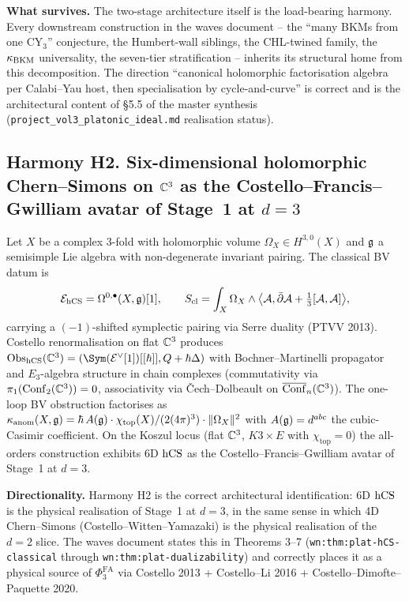 \textbf{What survives.} The two-stage architecture itself is the load-bearing
harmony. Every downstream construction in the waves document -- the
``many BKMs from one CY$_3$'' conjecture, the Humbert-wall siblings,
the CHL-twined family, the $\kappa_{\mathrm{BKM}}$ universality, the seven-tier
stratification -- inherits its structural home from this decomposition.
The direction ``canonical holomorphic factorisation algebra
per Calabi--Yau host, then specialisation by cycle-and-curve'' is
correct and is the architectural content of \S5.5 of the master
synthesis (\verb|project_vol3_platonic_ideal.md| realisation status).

\subsection{Harmony H2. Six-dimensional holomorphic Chern--Simons on
$\mathbb{C}^3$ as the Costello--Francis--Gwilliam avatar of Stage~1 at $d = 3$}
\label{wn:subsec:H2-6d-hCS}

\begin{theorem}\ClaimStatusScoped
\label{wn:thm:H2-6d-hCS}
Let $X$ be a complex 3-fold with holomorphic volume
$\Omega_X \in H^{3,0}(X)$ and $\mathfrak{g}$ a semisimple Lie algebra with
non-degenerate invariant pairing. The classical BV datum is
\[
\mathcal{E}_{\mathrm{hCS}} = \Omega^{0,\bullet}(X, \mathfrak{g})[1],
\qquad
S_{\mathrm{cl}} = \int_X \Omega_X \wedge
\bigl\langle \mathcal{A}, \bar\partial \mathcal{A} + \tfrac{1}{3}[\mathcal{A}, \mathcal{A}] \bigr\rangle,
\]
carrying a $(-1)$-shifted symplectic pairing via Serre duality (PTVV
2013). Costello renormalisation on flat $\mathbb{C}^3$ produces
$\Obs_{\hCS}(\CC^3) = (\Sym(\cE^\vee[1])[[\hbar]], Q + \hbar \Delta)$
with Bochner--Martinelli propagator and $E_3$-algebra structure in
chain complexes (commutativity via $\pi_1(\mathrm{Conf}_2(\mathbb{C}^3)) = 0$,
associativity via \v Cech--Dolbeault on
$\overline{\mathrm{Conf}}_n(\mathbb{C}^3)$). The one-loop BV obstruction factorises
as $\kappa_{\mathrm{anom}}(X, \mathfrak{g}) = \hbar\, A(\mathfrak{g}) \cdot \chi_{\mathrm{top}}(X) / (2(4\pi)^3)
\cdot \|\Omega_X\|^2$ with $A(\mathfrak{g}) = d^{abc}$ the cubic-Casimir coefficient.
On the Koszul locus (flat $\mathbb{C}^3$, $K3 \times E$ with $\chi_{\mathrm{top}} = 0$)
the all-orders construction exhibits 6D $\mathrm{hCS}$ as the Costello--Francis--Gwilliam
avatar of Stage~1 at $d = 3$.
\end{theorem}

\textbf{Directionality.} Harmony H2 is the correct architectural
identification: 6D $\mathrm{hCS}$ is the physical realisation of Stage~1 at
$d = 3$, in the same sense in which 4D Chern--Simons
(Costello--Witten--Yamazaki) is the physical realisation of the
$d = 2$ slice. The waves document states this in Theorems 3--7
(\verb|wn:thm:plat-hCS-classical| through
\verb|wn:thm:plat-dualizability|) and correctly places it as a
physical source of $\Phi^{\mathrm{FA}}_3$ via Costello 2013 +
Costello--Li 2016 + Costello--Dimofte--Paquette 2020.

